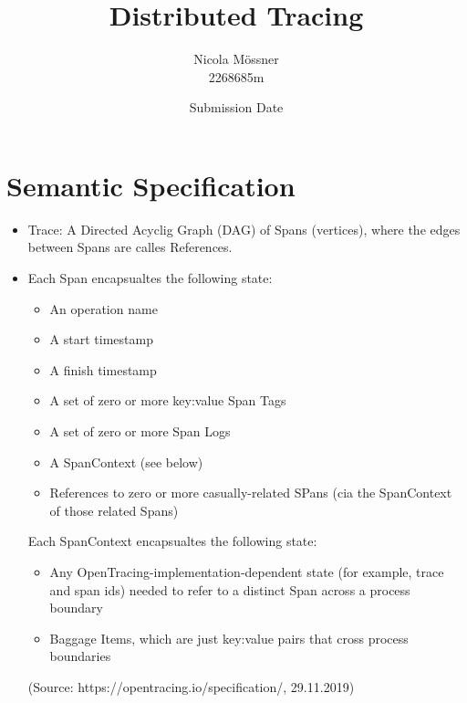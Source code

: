 \documentclass[11pt]{article}
\title{Distributed Tracing}
\author{Nicola M\"{o}ssner \\ 2268685m}
\date{Submission Date}
\begin{document}
\maketitle

\section{Semantic Specification}

\begin{itemize}
    \item Trace: A Directed Acyclig Graph (DAG) of Spans (vertices), where the edges between Spans are calles References.
    \item Each Span encapsualtes the following state:
    \begin{itemize}
        \item An operation name
        \item A start timestamp
        \item A finish timestamp
        \item A set of zero or more key:value Span Tags
        \item A set of zero or more Span Logs
        \item A SpanContext (see below)
        \item References to zero or more casually-related SPans (cia the SpanContext of those related Spans)
    \end{itemize}
    Each SpanContext encapsualtes the following state:
    \begin{itemize}
        \item Any OpenTracing-implementation-dependent state (for example, trace and span ids) needed to refer to a distinct Span across a process boundary
        \item Baggage Items, which are just key:value pairs that cross process boundaries 
    \end{itemize}
    (Source: https://opentracing.io/specification/, 29.11.2019)
\end{itemize}






\end{document}
